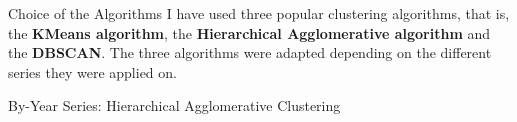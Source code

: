\documentclass[12pt]{beamer}
\begin{document}
        \begin{frame}{Choice of the Algorithms}
            I have used three popular clustering algorithms, that is, the \textbf{KMeans algorithm}, the
            \textbf{Hierarchical Agglomerative algorithm} and the \textbf{DBSCAN}. The three algorithms were
            adapted depending on the different series they were applied on.
        \end{frame}

        \begin{frame}{By-Year Series: Hierarchical Agglomerative Clustering}
            \begin{figure}
                \centering
            \end{figure}
        \end{frame}
\end{document}

